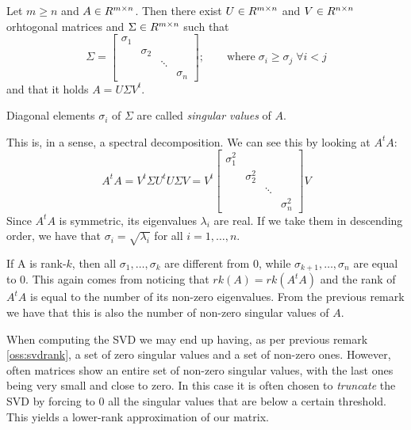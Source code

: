 \begin{Teo} \label{teo:svd}
  Let $m \geq n$ and $A \in R^{m \times n}$. Then there exist $U \in R^{m \times n}$ and $V \in R^{n \times n}$ orhtogonal matrices and $\Sigma \in R^{m \times n}$ such that
  \[
  \Sigma =
  \begin{bmatrix}
    \sigma_1 &&&\\
    & \sigma_2 &&\\
    && \ddots &\\
    &&& \sigma_n
  \end{bmatrix}
  ; \qquad \text{where} \; \sigma_i \geq \sigma_j \; \forall i < j
  \]
  and that it holds $A = U \Sigma V^t$.
\end{Teo}
Diagonal elements $\sigma_i$ of $\Sigma$ are called \emph{singular values} of $A$.
\begin{Oss}
  This is, in a sense, a spectral decomposition. We can see this by looking at $A^t A$:
  \[
  A^t A = V^t \Sigma U^t U \Sigma V = V^t
  \begin{bmatrix}
    \sigma_1^2 &&&\\
    & \sigma_2^2 &&\\
    && \ddots &\\
    &&& \sigma_n^2
  \end{bmatrix}
  V
  \]
  Since $A^t A$ is symmetric, its eigenvalues $\lambda_i$ are real. If we take them in descending order, we have that $\sigma_i = \sqrt{\lambda_i}$ for all $i = 1, \ldots, n$.
\end{Oss}
\begin{Oss} \label{oss:svdrank}
  If A is rank-$k$, then all $\sigma_1, \ldots, \sigma_k$ are different from $0$, while $\sigma_{k+1}, \ldots, \sigma_n$ are equal to $0$. This again comes from noticing that $rk(A) = rk(A^t A)$ and the rank of $A^t A$ is equal to the number of its non-zero eigenvalues. From the previous remark we have that this is also the number of non-zero singular values of $A$.
\end{Oss}

When computing the SVD we may end up having, as per previous remark \ref{oss:svdrank}, a set of zero singular values and a set of non-zero ones. However, often matrices show an entire set of non-zero singular values, with the last ones being very small and close to zero.
In this case it is often chosen to \emph{truncate} the SVD by forcing to $0$ all the singular values that are below a certain threshold. This yields a lower-rank approximation of our matrix.
